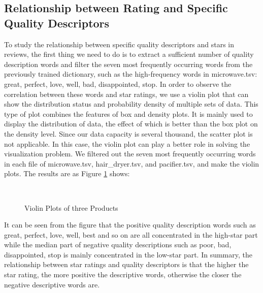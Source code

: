 \documentclass{mcmthesis}
\begin{document}
\subsection{Relationship between Rating and Specific Quality Descriptors}
To study the relationship between specific quality descriptors and stars in reviews, the first thing we need to do is to extract a sufficient number of quality description words and filter the seven most frequently occurring words from the previously trained dictionary, such as the high-frequency words in microwave.tsv: great, perfect, love, well, bad, disappointed, stop. 
In order to observe the correlation between these words and star ratings, we use a violin plot that can show the distribution status and probability density of multiple sets of data. This type of plot combines the features of box and density plots. It is mainly used to display the distribution of data, the effect of which is better than the box plot on the density level. Since our data capacity is several thousand, the scatter plot is not applicable. In this case, the violin plot can play a better role in solving the visualization problem.
We filtered out the seven most frequently occurring words in each file of microwave.tsv, hair\_dryer.tsv, and pacifier.tsv, and make the violin plots. The results are as Figure \ref{fig:3} shows:
\begin{figure}[htbp]
	\centering
	\qquad 
	\\
	\qquad
	\caption{Violin Plots of three Products} 
	\label{fig:3}
\end{figure}
It can be seen from the figure that the positive quality description words such as great, perfect, love, well, best and so on are all concentrated in the high-star part while the median part of negative quality descriptions such as poor, bad, disappointed, stop is mainly concentrated in the low-star part. In summary, the relationship between star ratings and quality descriptors is that the higher the star rating, the more positive the descriptive words, otherwise the closer the negative descriptive words are.
\end{document}
